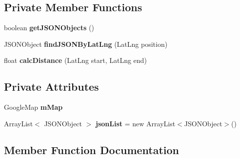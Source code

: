 \subsection*{Private Member Functions}
\begin{DoxyCompactItemize}
\item 
\mbox{\label{classcom_1_1jack_1_1motorbikestatistics_1_1_maps_activity_a0c72fcb79424420c3477add9ba6ab447}} 
boolean {\bfseries get\+J\+S\+O\+N\+Objects} ()
\item 
\mbox{\label{classcom_1_1jack_1_1motorbikestatistics_1_1_maps_activity_ae5478e56dfb617433d0dfaeb94a403c7}} 
J\+S\+O\+N\+Object {\bfseries find\+J\+S\+O\+N\+By\+Lat\+Lng} (Lat\+Lng position)
\item 
\mbox{\label{classcom_1_1jack_1_1motorbikestatistics_1_1_maps_activity_af4feb7617c02a59c62d6e9257914e997}} 
float {\bfseries calc\+Distance} (Lat\+Lng start, Lat\+Lng end)
\end{DoxyCompactItemize}
\subsection*{Private Attributes}
\begin{DoxyCompactItemize}
\item 
\mbox{\label{classcom_1_1jack_1_1motorbikestatistics_1_1_maps_activity_aaace5219464acf3df9ac5e9ce913eef5}} 
Google\+Map {\bfseries m\+Map}
\item 
\mbox{\label{classcom_1_1jack_1_1motorbikestatistics_1_1_maps_activity_aaed26c36e08dad942830ab52d9d75d2e}} 
Array\+List$<$ J\+S\+O\+N\+Object $>$ {\bfseries json\+List} = new Array\+List$<$J\+S\+O\+N\+Object$>$()
\end{DoxyCompactItemize}


\subsection{Member Function Documentation}
\mbox{\label{classcom_1_1jack_1_1motorbikestatistics_1_1_maps_activity_aefa35b548b2f39bb46b2cb5024be383c}} 
